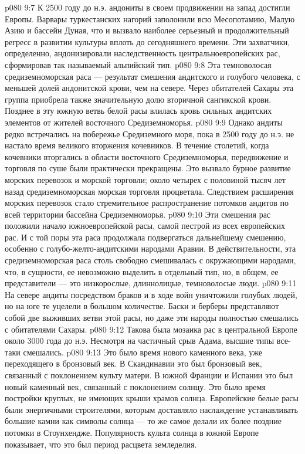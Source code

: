 \vs p080 9:7 К 2500 году до н.э. андониты в своем продвижении на запад достигли Европы. Варвары туркестанских нагорий заполонили всю Месопотамию, Малую Азию и бассейн Дуная, что и вызвало наиболее серьезный и продолжительный регресс в развитии культуры вплоть до сегодняшнего времени. Эти захватчики, определенно, андонизировали наследственность центральноевропейских рас, сформировав так называемый альпийский тип.
\vs p080 9:8 \pc {}\bibnobreakspace {} Эта темноволосая средиземноморская раса --- результат смешения андитского и голубого человека, с меньшей долей андонитской крови, чем на севере. Через обитателей Сахары эта группа приобрела также значительную долю вторичной сангикской крови. Позднее в эту южную ветвь белой расы влилась кровь сильных андитских элементов от жителей восточного Средиземноморья.
\vs p080 9:9 Однако андиты редко встречались на побережье Средиземного моря, пока в 2500 году до н.э. не настало время великого вторжения кочевников. В течение столетий, когда кочевники вторгались в области восточного Средиземноморья, передвижение и торговля по суше были практически прекращены. Это вызвало бурное развитие морских перевозок и морской торговли; около четырех с половиной тысяч лет назад средиземноморская морская торговля процветала. Следствием расширения морских перевозок стало стремительное распространение потомков андитов по всей территории бассейна Средиземноморья.
\vs p080 9:10 Эти смешения рас положили начало южноевропейской расы, самой пестрой из всех европейских рас. И с той поры эта раса продолжала подвергаться дальнейшему смешению, особенно с голубо\hyp{}желто\hyp{}андитскими народами Аравии. В действительности, эта средиземноморская раса столь свободно смешивалась с окружающими народами, что, в сущности, ее невозможно выделить в отдельный тип, но, в общем, ее представители --- это низкорослые, длиннолицые, темноволосые люди.
\vs p080 9:11 На севере андиты посредством браков и в ходе войн уничтожили голубых людей, но на юге те уцелели в большом количестве. Баски и берберы представляют собой две выживших ветви этой расы, но даже эти народы полностью смешались с обитателями Сахары.
\vs p080 9:12 \pc Такова была мозаика рас в центральной Европе около 3000 года до н.э. Несмотря на частичный срыв Адама, высшие типы все\hyp{}таки смешались.
\vs p080 9:13 \pc Это было время нового каменного века, уже переходящего в бронзовый век. В Скандинавии это был бронзовый век, связанный с поклонением культу матери. В южной Франции и Испании это был новый каменный век, связанный с поклонением солнцу. Это было время постройки круглых, не имеющих крыши храмов солнца. Европейские белые расы были энергичными строителями, которым доставляло наслаждение устанавливать большие камни как символы солнца --- то же самое делали их более поздние потомки в Стоунхендже. Популярность культа солнца в южной Европе показывает, что это был период расцвета земледелия.

